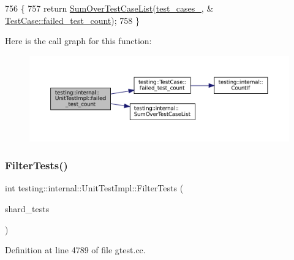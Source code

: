 \begin{DoxyCode}
756                                           \{
757   \textcolor{keywordflow}{return} \hyperlink{namespacetesting_1_1internal_a564f9e608c608736ebe2199ab831745b}{SumOverTestCaseList}(\hyperlink{classtesting_1_1internal_1_1UnitTestImpl_a79ec0f733ada2898efd1a7fbd8587fb3}{test\_cases\_}, &
      \hyperlink{classtesting_1_1TestCase_a70e26eb070c75ae62a191fa610ea234f}{TestCase::failed\_test\_count});
758 \}
\end{DoxyCode}
Here is the call graph for this function\+:
\nopagebreak
\begin{figure}[H]
\begin{center}
\leavevmode
\includegraphics[width=350pt]{classtesting_1_1internal_1_1UnitTestImpl_ad0abe95b66466268363d7fa407bac41b_cgraph}
\end{center}
\end{figure}
\mbox{\label{classtesting_1_1internal_1_1UnitTestImpl_abd47e447f0c2557ed528db0350671bed}} 
\subsubsection{\texorpdfstring{Filter\+Tests()}{FilterTests()}}
{\footnotesize\ttfamily int testing\+::internal\+::\+Unit\+Test\+Impl\+::\+Filter\+Tests (\begin{DoxyParamCaption}\item[{\hyperlink{classtesting_1_1internal_1_1UnitTestImpl_acc5ffd3f9bc2e87bb3dba4218f58af43}{Reaction\+To\+Sharding}}]{shard\+\_\+tests }\end{DoxyParamCaption})}



Definition at line 4789 of file gtest.\+cc.



